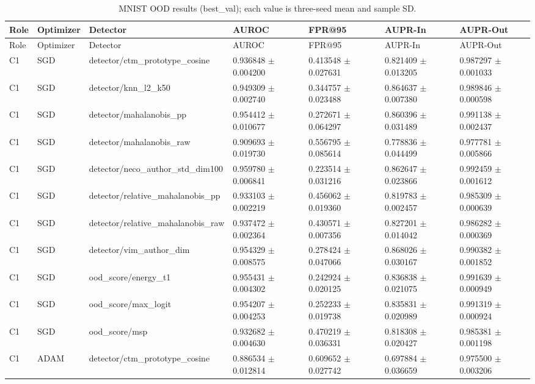 \begin{longtable}{lllllll}
\caption{MNIST OOD results (best\_val); each value is three-seed mean and sample SD.}\\
Role & Optimizer & Detector & AUROC & FPR@95 & AUPR-In & AUPR-Out \\
\hline
\endfirsthead
Role & Optimizer & Detector & AUROC & FPR@95 & AUPR-In & AUPR-Out \\
\hline
\endhead
C1 & SGD & detector/ctm\_prototype\_cosine & 0.936848 $\pm$ 0.004200 & 0.413548 $\pm$ 0.027631 & 0.821409 $\pm$ 0.013205 & 0.987297 $\pm$ 0.001033 \\
C1 & SGD & detector/knn\_l2\_k50 & 0.949309 $\pm$ 0.002740 & 0.344757 $\pm$ 0.023488 & 0.864637 $\pm$ 0.007380 & 0.989846 $\pm$ 0.000598 \\
C1 & SGD & detector/mahalanobis\_pp & 0.954412 $\pm$ 0.010677 & 0.272671 $\pm$ 0.064297 & 0.860396 $\pm$ 0.031489 & 0.991138 $\pm$ 0.002437 \\
C1 & SGD & detector/mahalanobis\_raw & 0.909693 $\pm$ 0.019730 & 0.556795 $\pm$ 0.085614 & 0.778836 $\pm$ 0.044499 & 0.977781 $\pm$ 0.005866 \\
C1 & SGD & detector/neco\_author\_std\_dim100 & 0.959780 $\pm$ 0.006841 & 0.223514 $\pm$ 0.031216 & 0.862647 $\pm$ 0.023866 & 0.992459 $\pm$ 0.001612 \\
C1 & SGD & detector/relative\_mahalanobis\_pp & 0.933103 $\pm$ 0.002219 & 0.456062 $\pm$ 0.019360 & 0.819783 $\pm$ 0.002457 & 0.985309 $\pm$ 0.000639 \\
C1 & SGD & detector/relative\_mahalanobis\_raw & 0.937472 $\pm$ 0.002364 & 0.430571 $\pm$ 0.007356 & 0.827201 $\pm$ 0.014042 & 0.986282 $\pm$ 0.000369 \\
C1 & SGD & detector/vim\_author\_dim & 0.954329 $\pm$ 0.008575 & 0.278424 $\pm$ 0.047066 & 0.868026 $\pm$ 0.030167 & 0.990382 $\pm$ 0.001852 \\
C1 & SGD & ood\_score/energy\_t1 & 0.955431 $\pm$ 0.004302 & 0.242924 $\pm$ 0.020125 & 0.836838 $\pm$ 0.021075 & 0.991639 $\pm$ 0.000949 \\
C1 & SGD & ood\_score/max\_logit & 0.954207 $\pm$ 0.004253 & 0.252233 $\pm$ 0.019738 & 0.835831 $\pm$ 0.020989 & 0.991319 $\pm$ 0.000924 \\
C1 & SGD & ood\_score/msp & 0.932682 $\pm$ 0.004630 & 0.470219 $\pm$ 0.036331 & 0.818308 $\pm$ 0.020427 & 0.985381 $\pm$ 0.001198 \\
C1 & ADAM & detector/ctm\_prototype\_cosine & 0.886534 $\pm$ 0.012814 & 0.609652 $\pm$ 0.027742 & 0.697884 $\pm$ 0.036659 & 0.975500 $\pm$ 0.003206 \\

\end{longtable}
